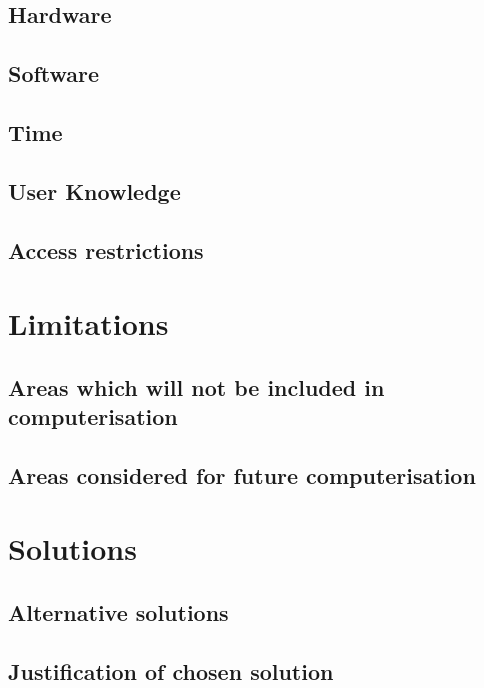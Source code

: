\documentclass[a4paper,12pt]{report}
\begin{document}
\subsection{Hardware}

\subsection{Software}

\subsection{Time}

\subsection{User Knowledge}

\subsection{Access restrictions}

\section{Limitations}

\subsection{Areas which will not be included in computerisation}

\subsection{Areas considered for future computerisation}

\section{Solutions}

\subsection{Alternative solutions}

\subsection{Justification of chosen solution}
\end{document}

